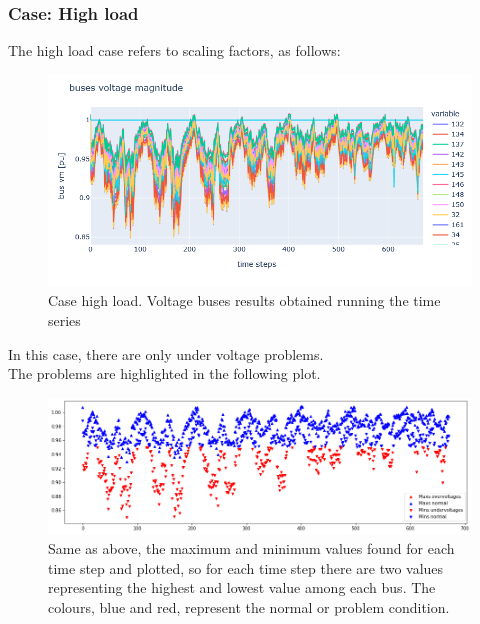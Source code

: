\subsubsection{Case: High load}
The high load case refers to scaling factors, as follows:
\begin{algorithm}[h]
    
\end{algorithm}

\begin{figure}[h]
\centering
    \includegraphics[width=.7\linewidth]{images/MVOberr/High load.png}
\caption{Case high load. Voltage buses results obtained running the time series}
\label{fig:gym_anm_net}
\end{figure}

In this case, there are only under voltage problems. \\
The problems are highlighted in the following plot.

\begin{figure}[h]
\centering
    \includegraphics[width=.8\linewidth]{images/MVOberr/High load problems.png}
    \caption{Same as above, the maximum and minimum values found for each time step and plotted, so for each time step there are two values representing the highest and lowest value among each bus. The colours, blue and red, represent the normal or problem condition.}
\end{figure}